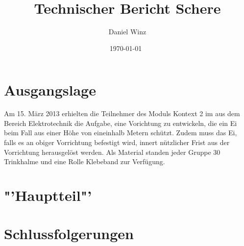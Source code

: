 \documentclass[a4paper,10pt,fleqn]{article}
\title{Technischer Bericht Schere}
\author{Daniel Winz}
\date{\today~\dtc}
\begin{document}
\maketitle

% 

\tableofcontents
\newpage

% 
\section{Ausgangslage}
Am 15. März 2013 erhielten die Teilnehmer des Moduls Kontext 2 im aus dem 
Bereich Elektrotechnik die Aufgabe, eine Vorichtung zu entwickeln, die ein Ei 
beim Fall aus einer Höhe von eineinhalb Metern schützt. Zudem muss das Ei, 
falls es an obiger Vorrichtung befestigt wird, innert nützlicher Frist aus der 
Vorrichtung herausgelöst werden. Als Material standen jeder Gruppe 30 
Trinkhalme und eine Rolle Klebeband zur Verfügung. %

\section{"'Hauptteil"'}

\section{Schlussfolgerungen}
\end{document}
